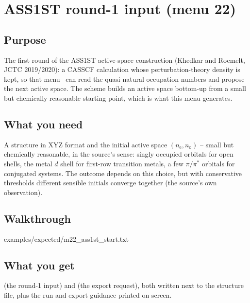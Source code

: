 \chapter{ASS1ST round-1 input (menu 22)}
\label{ch:menu22}

\section{Purpose}

The first round of the ASS1ST active-space construction (Khedkar and Roemelt,
JCTC 2019/2020): a CASSCF calculation whose perturbation-theory density is
kept, so that menu~ can read the quasi-natural occupation numbers and
propose the next active space.  The scheme builds an active space bottom-up
from a small but chemically reasonable starting point, which is what this menu
generates.

\section{What you need}

A structure in XYZ format and the initial active space $(n_{\mathrm{e}},
n_{\mathrm{o}})$ -- small but chemically reasonable, in the source's sense:
singly occupied orbitals for open shells, the metal $d$ shell for first-row
transition metals, a few $\pi/\pi^{*}$ orbitals for conjugated systems.  The
outcome depends on this choice, but with conservative thresholds different
sensible initials converge together (the source's own observation).

\section{Walkthrough}


  {examples/expected/m22_ass1st_start.txt}

\section{What you get}

 (the round-1 input) and  (the
export request), both written next to the structure file, plus the run and
export guidance printed on screen.

